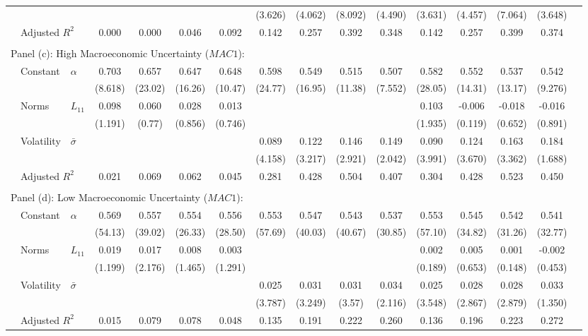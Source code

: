 \documentclass{article}
\begin{document}
\begin{sidewaystable}
\begin{center}
\begin{small}
\begin{tabular}{ll l c c c c c c c c c c c c c}
             &&&&&&&(3.626)&(4.062)&(8.092)&(4.490)&(3.631)&(4.457)&(7.064)&(3.648)\\
             &\multicolumn{2}{l}{Adjusted $R^2$}&0.000&0.000&0.046&0.092&0.142&0.257&0.392&0.348&0.142&0.257&0.399&0.374\\
             &&&&&&&&\\
             \multicolumn{9}{l}{Panel (c): High Macroeconomic Uncertainty ($MAC1$): }\\
             & Constant & $\alpha$ & 0.703&0.657&0.647&0.648&0.598&0.549&0.515&0.507&0.582&0.552&0.537&0.542\\
             &&&(8.618)&(23.02)&(16.26)&(10.47)&(24.77)&(16.95)&(11.38)&(7.552)&(28.05)&(14.31)&(13.17)&(9.276)\\
             & Norms & $L_{11}$ & 0.098&0.060&0.028&0.013&&&&&0.103&-0.006&-0.018&-0.016\\
             &&&(1.191)&(0.77)&(0.856)&(0.746)&&&&&(1.935)&(0.119)&(0.652)&(0.891)\\
             & Volatility & $\bar{\sigma}$&&&&&0.089&0.122&0.146&0.149&0.090&0.124&0.163&0.184\\
             &&&&&&&(4.158)&(3.217)&(2.921)&(2.042)&(3.991)&(3.670)&(3.362)&(1.688)\\
             & \multicolumn{2}{l}{Adjusted $R^2$}&0.021&0.069&0.062&0.045&0.281&0.428&0.504&0.407&0.304&0.428&0.523&0.450\\
             &&&&&&&\\
             \multicolumn{9}{l}{Panel (d): Low Macroeconomic Uncertainty ($MAC1$): }\\
             & Constant & $\alpha$ & 0.569&0.557&0.554&0.556&0.553&0.547&0.543&0.537&0.553&0.545&0.542&0.541\\
             &&&(54.13)&(39.02)&(26.33)&(28.50)&(57.69)&(40.03)&(40.67)&(30.85)&(57.10)&(34.82)&(31.26)&(32.77)\\
             & Norms & $L_{11}$ & 0.019&0.017&0.008&0.003&&&&&0.002&0.005&0.001&-0.002\\
             &&&(1.199)&(2.176)&(1.465)&(1.291)&&&&&(0.189)&(0.653)&(0.148)&(0.453)\\
             & Volatility & $\bar{\sigma}$ &&&&&0.025&0.031&0.031&0.034&0.025&0.028&0.028&0.033\\
             &&&&&&&(3.787)&(3.249)&(3.57)&(2.116)&(3.548)&(2.867)&(2.879)&(1.350)\\
             & \multicolumn{2}{l}{Adjusted $R^2$}&0.015&0.079&0.078&0.048&0.135&0.191&0.222&0.260&0.136&0.196&0.223&0.272\\

\end{tabular}
\end{small}
\end{center}
\end{sidewaystable}
\end{document}
